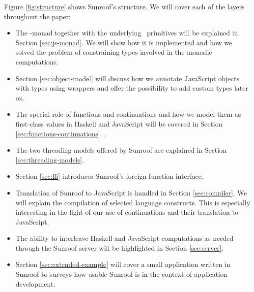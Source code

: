 Figure \ref{fig:structure} shows Sunroof's structure.
We will cover each of the layers throughout the paper:
\begin{itemize}
\item
The \JS-monad together with the underlying \JSI~primitives 
will be explained in Section \ref{sec:js-monad}. 
We will show how it is implemented and how we solved
the problem of constraining types involved in the monadic 
computations.
\item
Section \ref{sec:object-model} will discuss how we annotate 
JavaScript objects with types using wrappers 
and offer the possibility to add custom types later on.
\item
The special role of functions and continuations and
how we model them as first-class values in Haskell and JavaScript
will be covered in Section \ref{sec:functions-continuations}. .
\item
The two threading models offered by Sunroof are explained 
in Section \ref{sec:threading-models}.
\item
Section \ref{sec:ffi} introduces Sunroof's foreign function interface.
\item
Translation of Sunroof to JavaScript is handled in 
Section \ref{sec:compiler}. We will explain the 
compilation of selected language constructs. This is 
especially interesting in the light of our use of continuations
and their translation to JavaScript.
\item
The ability to interleave Haskell and JavaScript computations as needed
through the Sunroof server will be highlighted in Section \ref{sec:server}.
\item
Section \ref{sec:extended-example} will cover a small application 
written in Sunroof to surveys how usable Sunroof is in the 
context of application development. 
\end{itemize}

